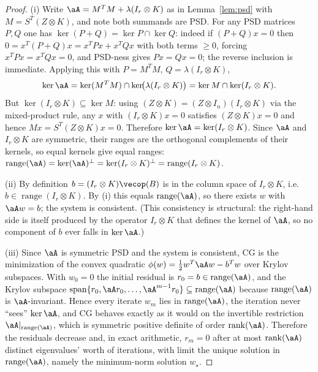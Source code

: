 \begin{proof}
(i) Write $\aA=M^{T}M+\lambda(I_r\otimes K)$ as in
Lemma~\ref{lem:psd} with $M=S^{T}(Z\otimes K)$, and note both summands are
PSD. For any PSD matrices $P,Q$ one has
$\ker(P+Q)=\ker P\cap\ker Q$: indeed if $(P+Q)x=0$ then
$0=x^{T}(P+Q)x=x^{T}Px+x^{T}Qx$ with both terms $\ge0$, forcing
$x^{T}Px=x^{T}Qx=0$, and PSD-ness gives $Px=Qx=0$; the reverse inclusion is
immediate. Applying this with $P=M^{T}M$, $Q=\lambda(I_r\otimes K)$,
\[
  \ker\aA=\ker(M^{T}M)\cap\ker\!\bigl(\lambda(I_r\otimes K)\bigr)
        =\ker M\cap\ker(I_r\otimes K).
\]
But $\ker(I_r\otimes K)\subseteq\ker M$: using
$(Z\otimes K)=(Z\otimes I_n)(I_r\otimes K)$ via the mixed-product rule, any
$x$ with $(I_r\otimes K)x=0$ satisfies $(Z\otimes K)x=0$ and hence
$Mx=S^{T}(Z\otimes K)x=0$. Therefore
$\ker\aA=\ker(I_r\otimes K)$. Since $\aA$ and $I_r\otimes K$ are symmetric,
their ranges are the orthogonal complements of their kernels, so equal kernels
give equal ranges:
$\operatorname{range}(\aA)=\ker(\aA)^{\perp}=\ker(I_r\otimes K)^{\perp}
=\operatorname{range}(I_r\otimes K)$.

\smallskip
(ii) By definition $b=(I_r\otimes K)\vecop(B)$ is in the column space of
$I_r\otimes K$, i.e.\ $b\in\operatorname{range}(I_r\otimes K)$. By (i) this
equals $\operatorname{range}(\aA)$, so there exists $w$ with $\aA w=b$; the
system is consistent. (This consistency is structural: the right-hand side is
itself produced by the operator $I_r\otimes K$ that defines the kernel of
$\aA$, so no component of $b$ ever falls in $\ker\aA$.)

\smallskip
(iii) Since $\aA$ is symmetric PSD and the system is consistent, CG is the
minimization of the convex quadratic
$\phi(w)=\tfrac12 w^{T}\aA w-b^{T}w$ over Krylov subspaces. With $w_0=0$ the
initial residual is $r_0=b\in\operatorname{range}(\aA)$, and the Krylov
subspace $\operatorname{span}\{r_0,\aA r_0,\dots,\aA^{m-1}r_0\}\subseteq
\operatorname{range}(\aA)$ because $\operatorname{range}(\aA)$ is
$\aA$-invariant. Hence every iterate $w_m$ lies in
$\operatorname{range}(\aA)$, the iteration never ``sees'' $\ker\aA$, and CG
behaves exactly as it would on the invertible restriction
$\aA|_{\operatorname{range}(\aA)}$, which is symmetric positive definite of
order $\operatorname{rank}(\aA)$. Therefore the residuals decrease and, in
exact arithmetic, $r_m=0$ after at most $\operatorname{rank}(\aA)$ distinct
eigenvalues' worth of iterations, with limit the unique solution in
$\operatorname{range}(\aA)$, namely the minimum-norm solution $w_\star$.
\end{proof}

